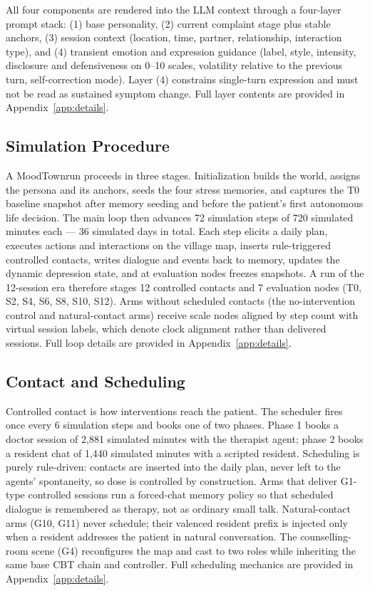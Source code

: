 \documentclass[10pt]{article}
\newcommand{\sys}{MoodTown}
\begin{document}
All four components are rendered into the LLM context through a four-layer prompt stack: (1) base personality, (2) current complaint stage plus stable anchors, (3) session context (location, time, partner, relationship, interaction type), and (4) transient emotion and expression guidance (label, style, intensity, disclosure and defensiveness on 0--10 scales, volatility relative to the previous turn, self-correction mode).
Layer (4) constrains single-turn expression and must not be read as sustained symptom change.
Full layer contents are provided in Appendix~\ref{app:details}.

\subsection{Simulation Procedure}\label{sec:procedure}

A \sys run proceeds in three stages.
Initialization builds the world, assigns the persona and its anchors, seeds the four stress memories, and captures the T0 baseline snapshot after memory seeding and before the patient's first autonomous life decision.
The main loop then advances 72 simulation steps of 720 simulated minutes each --- 36 simulated days in total.
Each step elicits a daily plan, executes actions and interactions on the village map, inserts rule-triggered controlled contacts, writes dialogue and events back to memory, updates the dynamic depression state, and at evaluation nodes freezes snapshots.
A run of the 12-session era therefore stages 12 controlled contacts and 7 evaluation nodes (T0, S2, S4, S6, S8, S10, S12).
Arms without scheduled contacts (the no-intervention control and natural-contact arms) receive scale nodes aligned by step count with virtual session labels, which denote clock alignment rather than delivered sessions.
Full loop details are provided in Appendix~\ref{app:details}.

\subsection{Contact and Scheduling}\label{sec:contact}

Controlled contact is how interventions reach the patient.
The scheduler fires once every 6 simulation steps and books one of two phases.
Phase 1 books a doctor session of 2{,}881 simulated minutes with the therapist agent; phase 2 books a resident chat of 1{,}440 simulated minutes with a scripted resident.
Scheduling is purely rule-driven: contacts are inserted into the daily plan, never left to the agents' spontaneity, so dose is controlled by construction.
Arms that deliver G1-type controlled sessions run a forced-chat memory policy so that scheduled dialogue is remembered as therapy, not as ordinary small talk.
Natural-contact arms (G10, G11) never schedule; their valenced resident prefix is injected only when a resident addresses the patient in natural conversation.
The counselling-room scene (G4) reconfigures the map and cast to two roles while inheriting the same base CBT chain and controller.
Full scheduling mechanics are provided in Appendix~\ref{app:details}.
\end{document}
